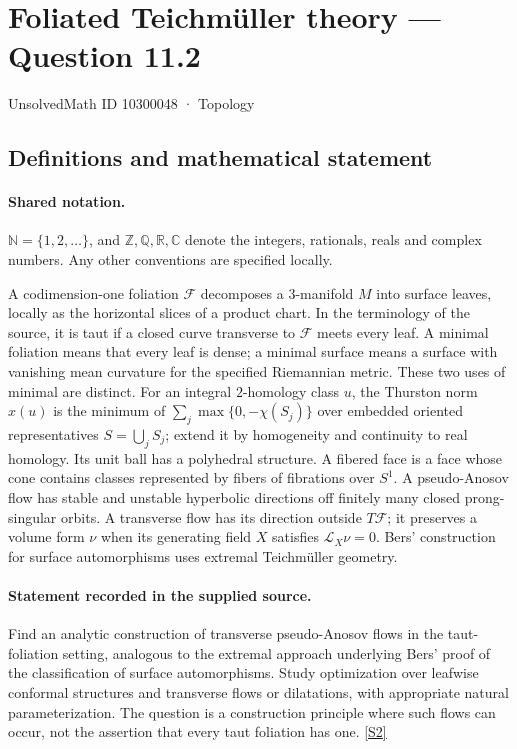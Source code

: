 \documentclass[11pt]{article}
\newcommand{\sref}[2]{\hyperlink{source:#1:#2}{[S#2]}}
\begin{document}
\setcounter{section}{10300047}
\section{Foliated Teichmüller theory — Question 11.2}\label{10300048}
{\small\sffamily UnsolvedMath ID 10300048 · Topology}
\subsection{Definitions and mathematical statement}

\paragraph{Shared notation.}$\mathbb N=\{1,2,\ldots\}$, and $\mathbb Z,\mathbb Q,\mathbb R,\mathbb C$ denote the integers, rationals, reals and complex numbers. Any other conventions are specified locally.


A codimension-one foliation $\mathcal F$ decomposes a $3$-manifold $M$ into surface leaves, locally as the horizontal slices of a product chart. In the terminology of the source, it is taut if a closed curve transverse to $\mathcal F$ meets every leaf. A minimal foliation means that every leaf is dense; a minimal surface means a surface with vanishing mean curvature for the specified Riemannian metric. These two uses of minimal are distinct. For an integral $2$-homology class $u$, the Thurston norm $x(u)$ is the minimum of $\sum_j\max\{0,-\chi(S_j)\}$ over embedded oriented representatives $S=\bigcup_j S_j$; extend it by homogeneity and continuity to real homology. Its unit ball has a polyhedral structure. A fibered face is a face whose cone contains classes represented by fibers of fibrations over $S^1$. A pseudo-Anosov flow has stable and unstable hyperbolic directions off finitely many closed prong-singular orbits. A transverse flow has its direction outside $T\mathcal F$; it preserves a volume form $\nu$ when its generating field $X$ satisfies $\mathcal L_X\nu=0$. Bers' construction for surface automorphisms uses extremal Teichm\"uller geometry.
\paragraph{Statement recorded in the supplied source.}
Find an analytic construction of transverse pseudo-Anosov flows in the taut-foliation setting, analogous to the extremal approach underlying Bers' proof of the classification of surface automorphisms. Study optimization over leafwise conformal structures and transverse flows or dilatations, with appropriate natural parameterization. The question is a construction principle where such flows can occur, not the assertion that every taut foliation has one. \sref{10300048}{2}
\end{document}
